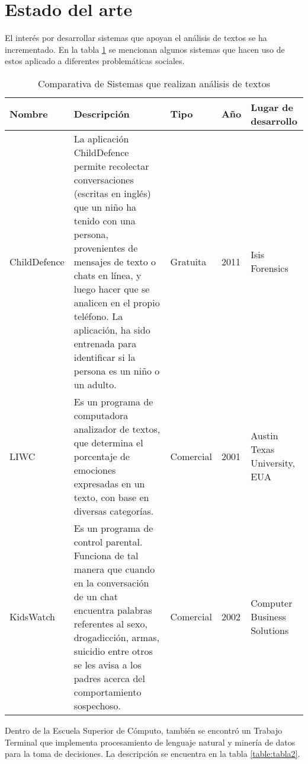 \section{Estado del arte}
El inter\'es por desarrollar sistemas que apoyan el an\'alisis de textos se ha incrementado. En la tabla \ref{table:tabla1estadodelarte} se mencionan algunos sistemas que hacen uso de estos aplicado a diferentes problem\'aticas sociales.   


\begin{center}
\begin{table}[h]
\begin{tabular}{|l|p{75mm}|l|l|p{25mm}|}
\hline
Nombre & Descripci\'on & Tipo & A\~no & Lugar de desarrollo \\
\hline
ChildDefence & La aplicaci\'on ChildDefence permite recolectar conversaciones (escritas en ingl\'es) que un ni\~no ha tenido con una persona,  provenientes de mensajes de texto o chats en l\'inea, y luego hacer que se analicen en el propio tel\'efono. La aplicaci\'on, ha sido entrenada para identificar si la persona es un ni\~no o un adulto. & Gratuita & 2011 & Isis Forensics \\
\hline
LIWC & Es un programa de computadora analizador de textos, que determina el porcentaje de emociones expresadas en un texto, con base en diversas categor\'ias. & Comercial & 2001 & Austin Texas University, EUA \\
\hline
KidsWatch & Es un programa de control parental. Funciona de tal manera que cuando en la  conversaci\'on de un chat encuentra palabras referentes al sexo, drogadicci\'on, armas, suicidio entre otros se les avisa a los padres acerca del comportamiento sospechoso. & Comercial & 2002 & Computer Business Solutions \\
\hline

\end{tabular}
\label{table:tabla1estadodelarte}
\caption{Comparativa de Sistemas que realizan análisis de textos}
\end{table}
\end{center}

Dentro de la Escuela Superior de C\'omputo, tambi\'en se encontr\'o un Trabajo Terminal que implementa procesamiento de lenguaje natural y miner\'ia de datos para la toma de decisiones. La descripci\'on se encuentra en la tabla \ref{table:tabla2}. \\ 

